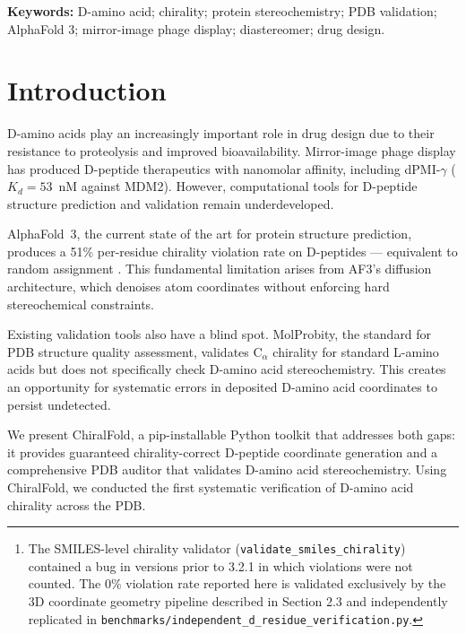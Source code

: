 \documentclass[11pt]{article}
\begin{document}
\begin{abstract}
head-to-head accuracy comparison.\footnote{The SMILES-level chirality validator (\texttt{validate\_smiles\_chirality}) contained a bug in versions prior to 3.2.1 in which violations were not counted. The 0\% violation rate reported here is validated exclusively by the 3D coordinate geometry pipeline described in Section 2.3 and independently replicated in \texttt{benchmarks/independent\_d\_residue\_verification.py}.} ChiralFold is available as a pip-installable Python package at \url{https://github.com/Tommaso-R-Marena/ChiralFold}.
\end{abstract}

\noindent\textbf{Keywords:} D-amino acid; chirality; protein stereochemistry; PDB validation; AlphaFold 3; mirror-image phage display; diastereomer; drug design.

\section{Introduction}

D-amino acids play an increasingly important role in drug design due to their resistance to proteolysis and improved bioavailability. Mirror-image phage display has produced D-peptide therapeutics with nanomolar affinity, including dPMI-$\gamma$ ($K_d=53$~nM against MDM2). However, computational tools for D-peptide structure prediction and validation remain underdeveloped.

AlphaFold~3, the current state of the art for protein structure prediction, produces a 51\% per-residue chirality violation rate on D-peptides --- equivalent to random assignment \citep{childs2025}. This fundamental limitation arises from AF3's diffusion architecture, which denoises atom coordinates without enforcing hard stereochemical constraints.

Existing validation tools also have a blind spot. MolProbity, the standard for PDB structure quality assessment, validates C$_\alpha$ chirality for standard L-amino acids but does not specifically check D-amino acid stereochemistry. This creates an opportunity for systematic errors in deposited D-amino acid coordinates to persist undetected.

We present ChiralFold, a pip-installable Python toolkit that addresses both gaps: it provides guaranteed chirality-correct D-peptide coordinate generation and a comprehensive PDB auditor that validates D-amino acid stereochemistry. Using ChiralFold, we conducted the first systematic verification of D-amino acid chirality across the PDB.
\end{document}

